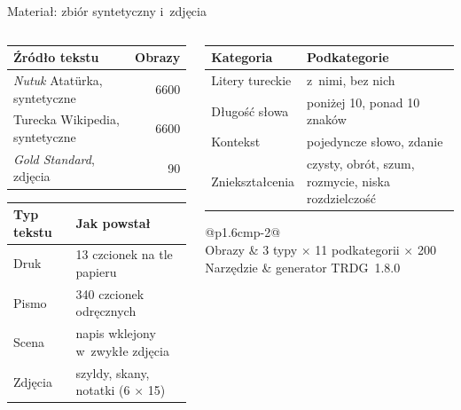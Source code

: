 \documentclass[aspectratio=169,11pt]{beamer}
\begin{document}
\begin{frame}{Materiał: zbiór syntetyczny i~zdjęcia}
  \begin{columns}[T]
    \begin{column}{0.48\textwidth}
      \footnotesize
      \begin{tabular*}{\linewidth}{@{}l@{\extracolsep{\fill}}r@{}}
        \textcolor{akcent!70!black}{Źródło tekstu} & Obrazy \\
        \midrule
        \emph{Nutuk} Atatürka, syntetyczne & 6600 \\
        Turecka Wikipedia, syntetyczne & 6600 \\
        \emph{Gold Standard}, zdjęcia & 90 \\
      \end{tabular*}

      \medskip
      \begin{tabular}{@{}L{1.6cm}P{\dimexpr\linewidth-1.6cm-2\tabcolsep\relax}@{}}
        Typ tekstu & Jak powstał \\
        \midrule
        Druk & 13 czcionek na tle papieru \\
        Pismo & 340 czcionek odręcznych \\
        Scena & napis wklejony w~zwykłe zdjęcia \\
        Zdjęcia & szyldy, skany, notatki (6 $\times$ 15) \\
      \end{tabular}
    \end{column}
    \begin{column}{0.48\textwidth}
      \footnotesize
      \begin{tabular}{@{}L{2.3cm}P{\dimexpr\linewidth-2.3cm-2\tabcolsep\relax}@{}}
        Kategoria & Podkategorie \\
        \midrule
        Litery tureckie & z~nimi, bez nich \\
        Długość słowa & poniżej 10, ponad 10 znaków \\
        Kontekst & pojedyncze słowo, zdanie \\
        Zniekształcenia & czysty, obrót, szum, rozmycie, niska rozdzielczość \\
      \end{tabular}

      \medskip
      \begin{tabular}{@{}L{1.6cm}P{\dimexpr\linewidth-1.6cm-2\tabcolsep\relax}@{}}
         \\
        \midrule
        Obrazy & 3 typy $\times$ 11 podkategorii $\times$ 200 \\
        Narzędzie & generator TRDG~1.8.0 \\
      \end{tabular}
    \end{column}
  \end{columns}


\end{frame}
\end{document}
